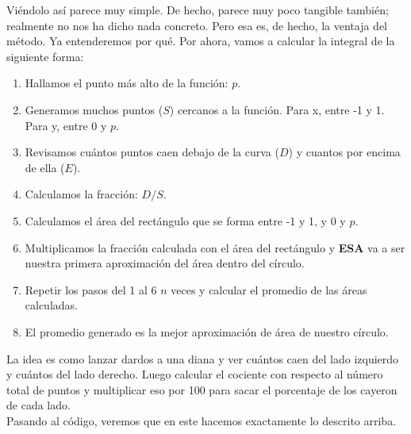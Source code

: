 \documentclass[10pt,letterpaper]{article}
\begin{document}
\noindent Vi\'endolo as\'i parece muy simple. De hecho, parece muy poco tangible tambi\'en; realmente no nos ha dicho nada concreto. Pero esa es, de hecho, la ventaja del m\'etodo. Ya entenderemos por qu\'e. Por ahora, vamos a calcular la integral de la siguiente forma:

\begin{enumerate}
\item Hallamos el punto m\'as alto de la funci\'on: $p$.
\item Generamos muchos puntos ($S$) cercanos a la funci\'on. Para x, entre -1 y 1. Para y, entre 0 y $p$.
\item Revisamos cu\'antos puntos caen debajo de la curva ($D$) y cuantos por encima de ella ($E$).
\item Calculamos la fracci\'on: $D/S$.
\item Calculamos el \'area del rect\'angulo que se forma entre -1 y 1, y 0 y $p$.
\item Multiplicamos la fracci\'on calculada con el \'area del rect\'angulo y \textbf{ESA} va a ser nuestra primera aproximaci\'on del \'area dentro del c\'irculo.
\item Repetir los pasos del 1 al 6 $n$ veces y calcular el promedio de las \'areas calculadas.
\item El promedio generado es la mejor aproximaci\'on de \'area de nuestro c\'irculo.
\end{enumerate}

\noindent La idea es como lanzar dardos a una diana y ver cu\'antos caen del lado izquierdo y cu\'antos del lado derecho. Luego calcular el cociente con respecto al n\'umero total de puntos y multiplicar eso por 100 para sacar el porcentaje de los cayeron de cada lado.\\

\noindent Pasando al c\'odigo, veremos que en este hacemos exactamente lo descrito arriba.
\end{document}
